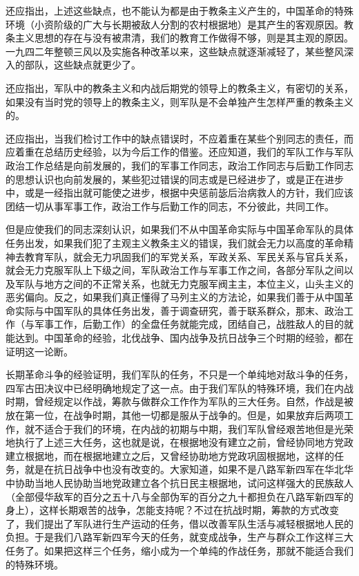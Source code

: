 还应指出，上述这些缺点，也不能认为都是由于教条主义产生的，中国革命的特殊环境（小资阶级的广大与长期被敌人分割的农村根据地）是其产生的客观原因。教条主义思想的存在与没有被肃清，我们的教育工作做得不够，则是其主观的原因。一九四二年整顿三风以及实施各种改革以来，这些缺点就逐渐减轻了，某些整风深入的部队，这些缺点就更少了。

还应指出，军队中的教条主义和内战后期党的领导上的教条主义，有密切的关系，如果没有当时党的领导上的教条主义，则军队是不会单独产生怎样严重的教条主义的。

还应指出，当我们检讨工作中的缺点错误时，不应着重在某些个别同志的责任，而应着重在总结历史经验，以为今后工作的借鉴。还应知道，我们的军队工作与军队政治工作总结是向前发展的，我们的军事工作同志，政治工作同志与后勤工作同志的思想认识也向前发展的，某些犯过错误的同志或是已经进步了，或是正在进步中，或是一经指出就可能使之进步，根据中央惩前毖后治病救人的方针，我们应该团结一切从事军事工作，政治工作与后勤工作的同志，不分彼此，共同工作。

但是应使我们的同志深刻认识，如果我们不从中国革命实际与中国革命军队的具体任务出发，如果我们犯了主观主义教条主义的错误，我们就会无力以高度的革命精神去教育军队，就会无力巩固我们的军党关系，军政关系、军民关系与官兵关系，就会无力克服军队上下级之间，军队政治工作与军事工作之间，各部分军队之间以及军队与地方之间的不正常关系，也就无力克服军阀主主，本位主义，山头主义的恶劣偏向。反之，如果我们真正懂得了马列主义的方法论，如果我们善于从中国革命实际与中国军队的具体任务出发，善于调查研究，善于联系群众，那末、政治工作（与军事工作，后勤工作）的全盘任务就能完成，团结自己，战胜敌人的目的就能达到。中国革命的经验，北伐战争、国内战争及抗日战争三个时期的经验，都在证明这一论断。

长期革命斗争的经验证明，我们军队的任务，不只是一个单纯地对敌斗争的任务，四军古田决议中已经明确地规定了这一点。由于我们军队的特殊环境，我们在内战时期，曾经规定以作战，筹款与做群众工作作为军队的三大任务。自然，作战是被放在第一位，在战争时期，其他一切都是服从于战争的。但是，如果放弃后两项工作，就不适合于我们的环境，在内战的初期与中期，我们军队曾经艰苦地但是光荣地执行了上述三大任务，这也就是说，在根据地没有建立之前，曾经协同地方党政建立根据地，而在根据地建立之后，又曾经协助地方党政巩固根据地，这样的任务，就是在抗日战争中也没有改变的。大家知道，如果不是八路军新四军在华北华中协助当地人民协助当地党政建立各个抗日民主根据地，试问这样强大的民族敌人（全部侵华敌军的百分之五十八与全部伪军的百分之九十都担负在八路军新四军的身上），这样长期艰苦的战争，怎能支持呢？不过在抗战时期，筹款的方式改变了，我们提出了军队进行生产运动的任务，借以改善军队生活与减轻根据地人民的负担。于是我们八路军新四军今天的任务，就变成战争，生产与群众工作这样三大任务了。如果把这样三个任务，缩小成为一个单纯的作战任务，那就不能适合我们的特殊环境。


